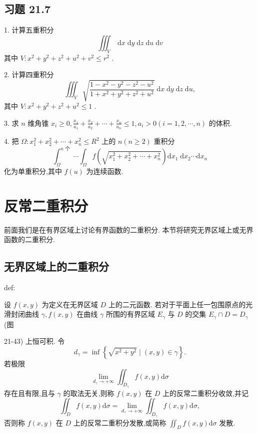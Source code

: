 \subsection{习题 21.7}

1. 计算五重积分
\[
{\iiint }_{V}\mathrm{\;d}x\mathrm{\;d}y\mathrm{\;d}z\mathrm{\;d}u\mathrm{\;d}v
\]
其中 \(V : {x}^{2} + {y}^{2} + {z}^{2} + {u}^{2} + {v}^{2} \leq  {r}^{2}\) .

2. 计算四重积分
\[
{\iiint }_{V}\sqrt{\frac{1 - {x}^{2} - {y}^{2} - {z}^{2} - {u}^{2}}{1 + {x}^{2} + {y}^{2} + {z}^{2} + {u}^{2}}}\mathrm{\;d}x\mathrm{\;d}y\mathrm{\;d}z\mathrm{\;d}u,
\]
其中 \(V : {x}^{2} + {y}^{2} + {z}^{2} + {u}^{2} \leq  1\) .

3. 求 \(n\) 维角锥 \({x}_{i} \geq  0,\frac{{x}_{1}}{{a}_{1}} + \frac{{x}_{2}}{{a}_{2}} + \cdots  + \frac{{x}_{n}}{{a}_{n}} \leq  1,{a}_{i} > 0\left( {i = 1,2,\cdots ,n}\right)\) 的体积.

4. 把 \(\Omega  : {x}_{1}^{2} + {x}_{2}^{2} + \cdots  + {x}_{n}^{2} \leq  {R}^{2}\) 上的 \(n\left( {n \geq  2}\right)\) 重积分
\[
{\int }_{\Omega }^{n\text{ 个 }}\cdots {\int }_{\Omega }f\left( \sqrt{{x}_{1}^{2} + {x}_{2}^{2} + \cdots  + {x}_{n}^{2}}\right) \mathrm{d}{x}_{1}\mathrm{\;d}{x}_{2}\cdots \mathrm{d}{x}_{n}
\]
化为单重积分,其中 \(f\left( u\right)\) 为连续函数.

\section{反常二重积分}

前面我们是在有界区域上讨论有界函数的二重积分. 本节将研究无界区域上或无界函数的二重积分.

\subsection{无界区域上的二重积分}

\begin{definition}{}{def:}

\end{definition}
设 \(f\left( {x,y}\right)\) 为定义在无界区域 \(D\) 上的二元函数. 若对于平面上任一包围原点的光滑封闭曲线 \(\gamma ,f\left( {x,y}\right)\) 在曲线 \(\gamma\) 所围的有界区域 \({E}_{\gamma }\) 与 \(D\) 的交集 \({E}_{\gamma } \cap  D = {D}_{\gamma }\) (图

21-43) 上恒可积. 令
\[
{d}_{\gamma } = \inf \left\{  {\sqrt{{x}^{2} + {y}^{2}} \mid  \left( {x,y}\right)  \in  \gamma }\right\}  .
\]
若极限
\[
\mathop{\lim }\limits_{{{d}_{\gamma } \rightarrow   + \infty }}{\iint }_{{D}_{\gamma }}f\left( {x,y}\right) \mathrm{d}\sigma
\]
存在且有限,且与 \(\gamma\) 的取法无关,则称 \(f\left( {x,y}\right)\) 在 \(D\) 上的反常二重积分收敛,并记
\[
{\iint }_{D}f\left( {x,y}\right) \mathrm{d}\sigma  = \mathop{\lim }\limits_{{{d}_{\gamma } \rightarrow   + \infty }}{\iint }_{{D}_{\gamma }}f\left( {x,y}\right) \mathrm{d}\sigma , \tag{1}
\]
否则称 \(f\left( {x,y}\right)\) 在 \(D\) 上的反常二重积分发散,或简称 \({\iint }_{D}f\left( {x,y}\right) \mathrm{d}\sigma\) 发散.

